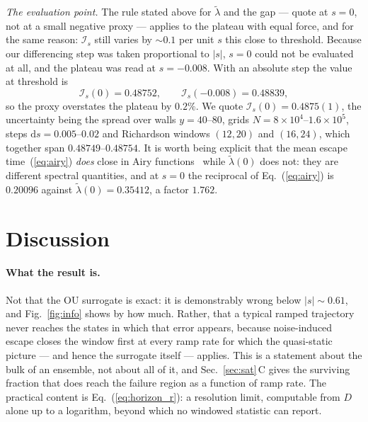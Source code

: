 \documentclass[%
 aip,
 cha,
 amsmath,amssymb,
 reprint,
 superscriptaddress,
 floatfix,
]{revtex4-2}
\newcommand{\dd}{\mathrm{d}}
\newcommand{\Ifish}{\mathcal{I}}
\begin{document}
\emph{The evaluation point.}  The rule stated above for $\tilde\lambda$ and the gap --- quote at $s=0$, not at a small negative proxy --- applies to the plateau with equal force, and for the same reason: $\Ifish_s$ still varies by ${\sim}0.1$ per unit $s$ this close to threshold.  Because our differencing step was taken proportional to $|s|$, $s=0$ could not be evaluated at all, and the plateau was read at $s=-0.008$.  With an absolute step the value at threshold is
\begin{equation}
\label{eq:plateauval}
\Ifish_s(0)=0.48752,\qquad \Ifish_s(-0.008)=0.48839 ,
\end{equation}
so the proxy overstates the plateau by $0.2\%$.  We quote $\Ifish_s(0)=0.4875(1)$, the uncertainty being the spread over walls $y=40$--$80$, grids $N=8\times10^4$--$1.6\times10^5$, steps $\dd s=0.005$--$0.02$ and Richardson windows $(12,20)$ and $(16,24)$, which together span $0.48749$--$0.48754$.  It is worth being explicit that the mean escape time~(\ref{eq:airy}) \emph{does} close in Airy functions~\cite{HathcockSethna2021} while $\tilde\lambda(0)$ does not: they are different spectral quantities, and at $s=0$ the reciprocal of Eq.~(\ref{eq:airy}) is $0.20096$ against $\tilde\lambda(0)=0.35412$, a factor $1.762$.

\section{\label{sec:disc}Discussion}

\paragraph{What the result is.}
Not that the OU surrogate is exact: it is demonstrably wrong below $|s|\sim0.61$, and Fig.~\ref{fig:info} shows by how much.  Rather, that a typical ramped trajectory never reaches the states in which that error appears, because noise-induced escape closes the window first at every ramp rate for which the quasi-static picture --- and hence the surrogate itself --- applies.  This is a statement about the bulk of an ensemble, not about all of it, and Sec.~\ref{sec:sat}\,C gives the surviving fraction that does reach the failure region as a function of ramp rate.  The practical content is Eq.~(\ref{eq:horizon_r}): a resolution limit, computable from $D$ alone up to a logarithm, beyond which no windowed statistic can report.
\end{document}
